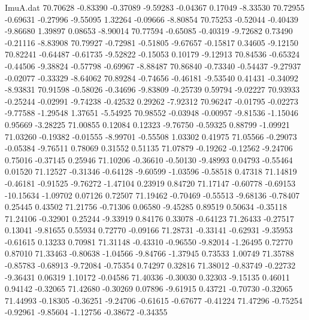\begin{filecontents}{ImuA.dat}
  70.70628   -0.83390   -0.37089   -9.59283   -0.04367    0.17049   -8.33530
  70.72955   -0.69631   -0.27996   -9.55095    1.32264   -0.09666   -8.80854
  70.75253   -0.52044   -0.40439   -9.86680    1.39897    0.08653   -8.90014
  70.77594   -0.65085   -0.40319   -9.72682    0.73490   -0.21116   -8.83908
  70.79927   -0.72981   -0.51805   -9.67657   -0.15817    0.34605   -9.12150
  70.82241   -0.64487   -0.61735   -9.52822   -0.15053    0.10179   -9.12913
  70.84536   -0.65324   -0.44506   -9.38824   -0.57798   -0.69967   -8.88487
  70.86840   -0.73340   -0.54437   -9.27937   -0.02077   -0.33329   -8.64062
  70.89284   -0.74656   -0.46181   -9.53540    0.41431   -0.34092   -8.93831
  70.91598   -0.58026   -0.34696   -9.83809   -0.25739    0.59794   -9.02227
  70.93933   -0.25244   -0.02991   -9.74238   -0.42532    0.29262   -7.92312
  70.96247   -0.01795   -0.02273   -9.77588   -1.29548    1.37651   -5.54925
  70.98552   -0.03948   -0.00957   -9.81536   -1.15046    0.95669   -3.28225
  71.00855    0.12084    0.12323   -9.76750   -0.59325    0.88799   -1.09921
  71.03260   -0.19382   -0.01555   -8.99701   -0.55508    1.03302    0.41975
  71.05566   -0.29073   -0.05384   -9.76511    0.78069    0.31552    0.51135
  71.07879   -0.19262   -0.12562   -9.24706    0.75016   -0.37145    0.25946
  71.10206   -0.36610   -0.50130   -9.48993    0.04793   -0.55464    0.01520
  71.12527   -0.31346   -0.64128   -9.60599   -1.03596   -0.58518    0.47318
  71.14819   -0.46181   -0.91525   -9.76272   -1.47104    0.23919    0.84720
  71.17147   -0.60778   -0.69153  -10.15634   -1.09702    0.07126    0.72507
  71.19462   -0.70469   -0.55513   -9.68136   -0.78407    0.25445    0.43502
  71.21756   -0.71306    0.06580   -9.45285    0.89519    0.50634   -0.35118
  71.24106   -0.32901    0.25244   -9.33919    0.84176    0.33078   -0.64123
  71.26433   -0.27517    0.13041   -9.81655    0.55934    0.72770   -0.09166
  71.28731   -0.33141   -0.62931   -9.35953   -0.61615    0.13233    0.70981
  71.31148   -0.43310   -0.96550   -9.82014   -1.26495    0.72770    0.87010
  71.33463   -0.80638   -1.04566   -9.84766   -1.37945    0.73533    1.00749
  71.35788   -0.85783   -0.68913   -9.72084   -0.75354    0.74297    0.32816
  71.38012   -0.83749   -0.22732   -9.36431    0.06319    1.10172   -0.04586
  71.40336   -0.30030    0.32303   -9.15135    0.46011    0.94142   -0.32065
  71.42680   -0.30269    0.07896   -9.61915    0.43721   -0.70730   -0.32065
  71.44993   -0.18305   -0.36251   -9.24706   -0.61615   -0.67677   -0.41224
  71.47296   -0.75254   -0.92961   -9.85604   -1.12756   -0.38672   -0.34355

\end{filecontents}
